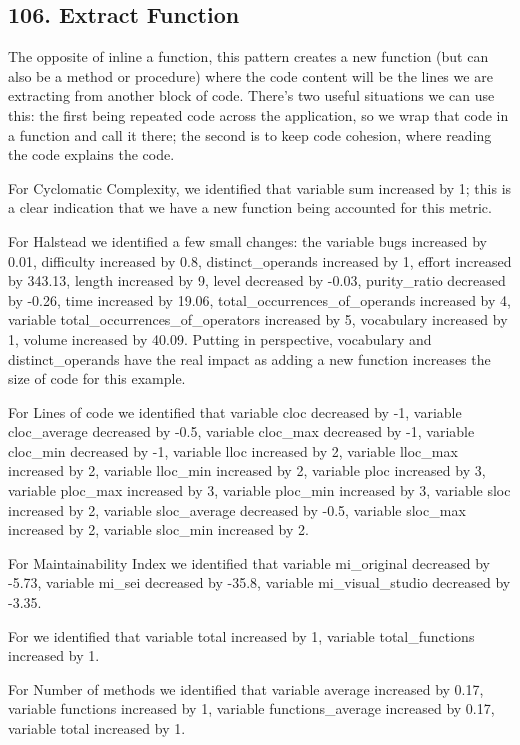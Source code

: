 \subsection{106. Extract Function}

The opposite of inline a function, this pattern creates a new function (but can also be a method or procedure) where the
code content will be the lines we are extracting from another block of code.
There's two useful situations we can use this: the first being repeated code across the application, so we wrap that code
in a function and call it there; the second is to keep code cohesion, where reading the code explains the code.

For Cyclomatic Complexity, we identified that variable sum increased by 1; this is a clear indication that we have a new
function being accounted for this metric.

For Halstead we identified a few small changes: the variable bugs increased by 0.01, difficulty increased by 0.8,
distinct\_operands increased by 1, effort increased by 343.13, length increased by 9, level decreased by -0.03,
purity\_ratio decreased by -0.26, time increased by 19.06, total\_occurrences\_of\_operands increased by 4,
variable total\_occurrences\_of\_operators increased by 5, vocabulary increased by 1, volume increased by 40.09.
Putting in perspective, vocabulary and distinct\_operands have the real impact as adding a new function increases
the size of code for this example.

For Lines of code we identified that variable cloc decreased by -1, variable cloc\_average decreased by -0.5, variable cloc\_max decreased by -1, variable cloc\_min decreased by -1, variable lloc increased by 2, variable lloc\_max increased by 2, variable lloc\_min increased by 2, variable ploc increased by 3, variable ploc\_max increased by 3, variable ploc\_min increased by 3, variable sloc increased by 2, variable sloc\_average decreased by -0.5, variable sloc\_max increased by 2, variable sloc\_min increased by 2.

For Maintainability Index we identified that variable mi\_original decreased by -5.73, variable mi\_sei decreased by -35.8, variable mi\_visual\_studio decreased by -3.35.

For we identified that variable total increased by 1, variable total\_functions increased by 1.

For Number of methods we identified that variable average increased by 0.17, variable functions increased by 1, variable functions\_average increased by 0.17, variable total increased by 1.

